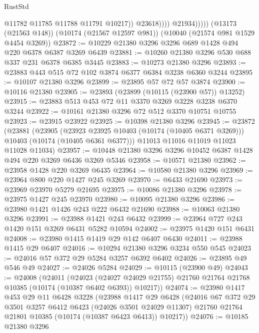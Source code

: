 \begin{lexlean}{RustStd}
\begin{coremodule}
                          @11782
                          @11785
                          @11788
                          @11791
                          @10217))
                      @23618))))
              @21934)))))
    (@13173 (@21563 @148))
    (@10174 (@21567 @12597 @981))
    (@10040 (@21574 @981 @1529 @4454 @3269))
@23872 := @10229 @21380 @3296 @3296 @689 @1428 @494 @220 @6378 @6387 @3269 @6439
@23881 := @10260 @21380 @3296 @530 @688 @337 @231 @6378 @6385 @3445
@23883 := @10273 @21380 @3296
@23893 := @23883 @443 @515 @72 @102 @3874 @6377 @6384 @3238 @6360 @3244
@23895 := @10107 @21380 @3296
@23899 := @23895 @57 @72 @57 @3874
@23900 := @10116 @21380
@23905 := @23893 (@23899 (@10115 (@23900 @57)) @13252)
@23915 := @23883 @513 @453 @72 @11 @3370 @3269 @3228 @3238 @6370 @3244
@23922 := @10161 @21380 @3296 @72 @512 @3370 @10751 @10755
@23923 := @23915 @23922
@23925 := @10398 @21380 @3296
@23945 := @23872
    (@23881
      (@23905
        (@23923 @23925 @10403 (@10174 (@10405 @6371 @3269)))
        @10403
        (@10174 (@10405 @6361 @6377)))
      @11013
      @11016
      @11019
      @11023
      @11028
      @11034)
@23957 := @10448 @21380 @3296 @3296 @10452 @6387 @1428 @494 @220 @3269 @6436 @3269 @5346
@23958 := @10571 @21380
@23962 := @23958 @1428 @220 @3269 @6435
@23964 := @10580 @21380 @3296
@23969 := @23964 @800 @220 @1427 @245 @3269
@23970 := @6433 @21690
@23973 := @23969 @23970 @5279 @21695
@23975 := @10086 @21380 @3296
@23978 := @23975 @1427 @245 @23970
@23980 := @10095 @21380 @3296
@23986 := @23980 @1421 @1426 @243 @222 @6432 @21690
@23988 := @10063 @21380 @3296
@23991 := @23988 @1421 @243 @6432
@23999 := @23964 @727 @243 @1420 @151 @3269 @6431 @5282 @10594
@24002 := @23975 @1420 @151 @6431
@24008 := @23980 @1415 @1419 @29 @142 @6407 @6430
@24011 := @23988 @1415 @29 @6407
@24016 := @10294 @21380 @3296 @3234 @550 @545
@24023 := @24016 @57 @372 @29 @5284 @3257 @6392 @6402
@24026 := @23895 @49 @546 @49
@24027 := @24026 @5284
@24029 := @10115 (@23900 @49)
@24043 := @24008
    (@24011
      (@24023
        (@24027 @24029 @21755)
        @21760
        @21764
        @21768
        @10385
        (@10174 (@10387 @6402 @6393))
        @10217))
@24074 := @23980
    @1417
    @453
    @29
    @11
    @6428
    @3228
    (@23988
      @1417
      @29
      @6428
      (@24016
        @67
        @372
        @29
        @3501
        @3257
        @6412
        @6423
        (@24026 @3501 @24029 @11307)
        @21760
        @21764
        @21801
        @10385
        (@10174 (@10387 @6423 @6413))
        @10217))
@24076 := @10185 @21380 @3296

\end{coremodule}
\end{lexlean}
